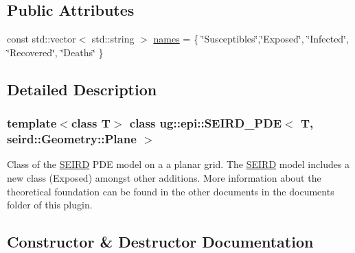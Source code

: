 \subsection*{Public Attributes}
\begin{DoxyCompactItemize}
\item 
const std\+::vector$<$ std\+::string $>$ \hyperlink{classug_1_1epi_1_1_s_e_i_r_d___p_d_e_3_01_t_00_01seird_1_1_geometry_1_1_plane_01_4_a38c997d8d89e2fece3bb806ecf841c57}{names} = \{ \char`\"{}Susceptibles\char`\"{},\char`\"{}Exposed\char`\"{}, \char`\"{}Infected\char`\"{}, \char`\"{}Recovered\char`\"{}, \char`\"{}Deaths\char`\"{} \}
\end{DoxyCompactItemize}


\subsection{Detailed Description}
\subsubsection*{template$<$class T$>$\newline
class ug\+::epi\+::\+S\+E\+I\+R\+D\+\_\+\+P\+D\+E$<$ T, seird\+::\+Geometry\+::\+Plane $>$}

Class of the \hyperlink{classug_1_1epi_1_1_s_e_i_r_d}{S\+E\+I\+RD} P\+DE model on a a planar grid. The \hyperlink{classug_1_1epi_1_1_s_e_i_r_d}{S\+E\+I\+RD} model includes a new class (Exposed) amongst other additions. More information about the theoretical foundation can be found in the other documents in the documents folder of this plugin. 

\subsection{Constructor \& Destructor Documentation}
\mbox{\label{classug_1_1epi_1_1_s_e_i_r_d___p_d_e_3_01_t_00_01seird_1_1_geometry_1_1_plane_01_4_acee8173ad6d681ca2333dcccb7e60512}} 
